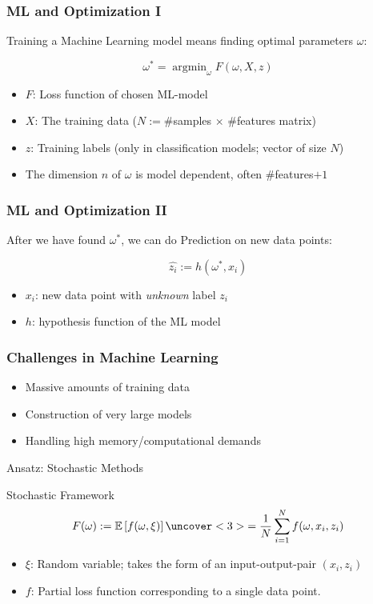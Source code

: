 \documentclass[10pt]{beamer}
\DeclareMathOperator{\argmin}{argmin}
\begin{document}
  \begin{frame}\frametitle{ML and Optimization I}
    \alert{Training} a Machine Learning model means finding optimal parameters $\omega$:

    $$ \omega^* = \argmin_{\omega} F(\omega, X, z)$$
    \pause
    \begin{itemize}
      \item \alert{$F$}: Loss function of chosen ML-model
      \item \alert{$X$}: The training data ($N:=\#$samples $\times$ $\#$features matrix)
      \item \alert{$z$}: Training labels (only in classification models; vector of size $N$)
      \pause
      \item The dimension $n$ of $\omega$ is model dependent, often $\#$features$+1$
    \end{itemize}   
  \end{frame}

  \begin{frame}\frametitle{ML and Optimization II}
    After we have found $\omega^*$, we can do \alert{Prediction} on new data points:

    $$ \hat {z_i} := h(\omega^*, x_i)$$
    \pause
    \begin{itemize}
      \item \alert{$x_i$}: new data point with \emph{unknown} label \alert{$z_i$}
      \item \alert{$h$}: hypothesis function of the ML model
    \end{itemize}   
  \end{frame}

  \begin{frame}
    \frametitle{Challenges in Machine Learning}
      \begin{itemize}
        \item Massive amounts of training data 
        \item Construction of very large models
        \item Handling high memory/computational demands
      \end{itemize}
      \vspace{36pt}
      \pause
    \centering \large{Ansatz: \alert{Stochastic Methods}}
  \end{frame}
  
  \begin{frame}{Stochastic Framework}
    $$ F(\omega) := \mathbb{E}\left[f(\omega, \xi)\right] \uncover<3>{= \frac{1}{N}\sum_{i=1}^N f(\omega, x_i, z_i)}$$
    \begin{itemize}
      \item<2-> \alert{$\xi$}: Random variable; takes the form of an input-output-pair $(x_i, z_i)$
      \item<3-> \alert{$f$}: Partial loss function corresponding to a single data point.
    \end{itemize}
  \end{frame}
\end{document}
